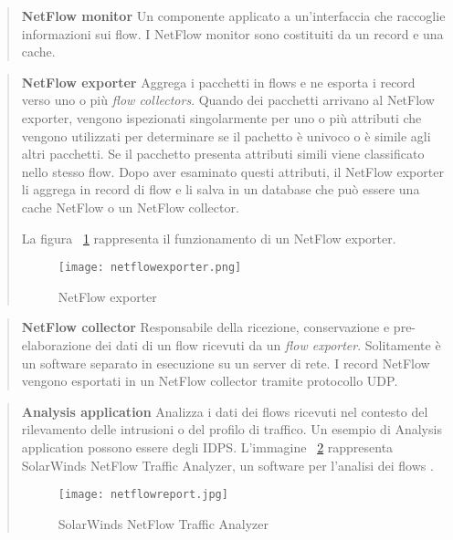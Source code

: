 \documentclass[../main.tex]{subfiles}
\begin{document}
\begin{verse}
\textbf{NetFlow monitor}
Un componente applicato a un'interfaccia che raccoglie informazioni sui flow. I NetFlow monitor sono costituiti da un record e una cache.
\end{verse}

\begin{verse}
\textbf{NetFlow exporter}
Aggrega i pacchetti in flows e ne esporta i record verso uno o più \textit{flow collectors}.
Quando dei pacchetti arrivano al NetFlow exporter, vengono ispezionati singolarmente per uno o più attributi che vengono utilizzati per determinare se il pachetto è univoco o è simile agli altri pacchetti. Se il pacchetto presenta attributi simili viene classificato nello stesso flow.
Dopo aver esaminato questi attributi, il NetFlow exporter li aggrega in record di flow e li salva in un database che può essere una cache NetFlow o un NetFlow collector. 

La figura ~\ref{fig:netflowExporter} rappresenta il funzionamento di un NetFlow exporter.

\begin{figure}[H]
\centering
\texttt{[image: netflowexporter.png]}
\caption{NetFlow exporter}
\label{fig:netflowExporter}
\end{figure}

\end{verse}

\begin{verse}
\textbf{NetFlow collector}
Responsabile della ricezione, conservazione e pre-elaborazione dei dati di un flow ricevuti da un \textit{flow exporter}. Solitamente è un software separato in esecuzione su un server di rete. I record NetFlow vengono esportati in un NetFlow collector tramite protocollo UDP.
\end{verse}

\begin{verse}
\textbf{Analysis application} 
Analizza i dati dei flows ricevuti nel contesto del rilevamento delle intrusioni o del profilo di traffico. Un esempio di Analysis application possono essere degli IDPS.
L'immagine ~\ref{fig:solarwinds} rappresenta SolarWinds NetFlow Traffic Analyzer, un software per l'analisi dei flows \cite{solarwinds}.

\begin{figure}[H]
\centering
\texttt{[image: netflowreport.jpg]}
\caption{SolarWinds NetFlow Traffic Analyzer}
\label{fig:solarwinds}
\end{figure}
\end{verse}
\end{document}
